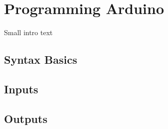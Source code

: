 \documentclass[11pt,a4paper]{article}
\begin{document}
\section{Programming Arduino} %
\label{sec:programming_arduino}

Small intro text

\subsection{Syntax Basics} %
\label{sub:syntax_basics}


\subsection{Inputs} %
\label{sub:inputs}


\subsection{Outputs} %
\label{sub:available_hardware}





 
 \nocite{*}
\end{document}
